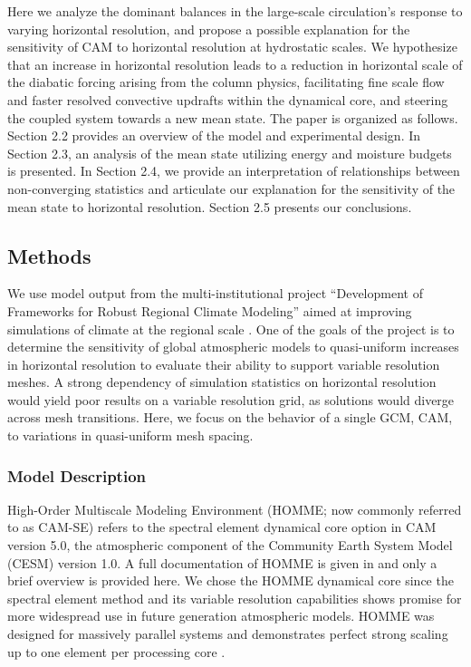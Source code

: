 Here we analyze the dominant balances in the large-scale circulation’s response to varying horizontal resolution, and propose a possible explanation for the sensitivity of CAM to horizontal resolution at hydrostatic scales. We hypothesize that an increase in horizontal resolution leads to a reduction in horizontal scale of the diabatic forcing arising from the column physics, facilitating fine scale flow and faster resolved convective updrafts within the dynamical core, and steering the coupled system towards a new mean state. The paper is organized as follows. Section 2.2 provides an overview of the model and experimental design. In Section 2.3, an analysis of the mean state utilizing energy and moisture budgets is presented. In Section 2.4, we provide an interpretation of relationships between non-converging statistics and articulate our explanation for the sensitivity of the mean state to horizontal resolution. Section 2.5 presents our conclusions. 

\subsection{Methods}
We use model output from the multi-institutional project “Development of Frameworks for Robust Regional Climate Modeling” aimed at improving simulations of climate at the regional scale \citep{L2013EOS}. One of the goals of the project is to determine the sensitivity of global atmospheric models to quasi-uniform increases in horizontal resolution to evaluate their ability to support variable resolution meshes. A strong dependency of simulation statistics on horizontal resolution would yield poor results on a variable resolution grid, as solutions would diverge across mesh transitions. Here, we focus on the behavior of a single GCM, CAM, to variations in quasi-uniform mesh spacing.

\subsubsection{Model Description}
High-Order Multiscale Modeling Environment (HOMME; now commonly referred to as CAM-SE) refers to the spectral element dynamical core option in CAM version 5.0, the atmospheric component of the Community Earth System Model (CESM) version 1.0. A full documentation of HOMME is given in \cite{CAM5} and only a brief overview is provided here. We chose the HOMME dynamical core since the spectral element method and its variable resolution capabilities \citep{ZetAl2014JCb} shows promise for more widespread use in future generation atmospheric models. HOMME was designed for massively parallel systems and demonstrates perfect strong scaling up to one element per processing core \citep{DetAl2012IJHPCA}. 

